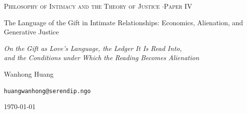 \documentclass[11pt,a4paper]{article}
\begin{document}
\begin{titlepage}
\centering
\vspace*{3.2cm}
{\footnotesize\color{rosedeep}\scshape Philosophy of Intimacy and the Theory of Justice \quad$\cdot$\quad Paper IV\par}
\vspace{0.7cm}
\coverrule\par
\vspace{1.2cm}
{\color{warnred}\LARGE The Language of the Gift in Intimate Relationships: Economics, Alienation, and Generative Justice\par}
\vspace{0.9cm}
{\color{warnred}\large\itshape On the Gift as Love's Language, the Ledger It Is Read Into,\\
and the Conditions under Which the Reading Becomes Alienation\par}
\vspace{1.7cm}
\coverrule[0.25]\par
\vspace{1.0cm}
{\large Wanhong Huang\par}
\vspace{0.2cm}
{\normalsize\texttt{huangwanhong@serendip.ngo}\par}
\vspace{1.0cm}
{\normalsize \today\par}
\vfill
\coverfootnote
\end{titlepage}
\end{document}
